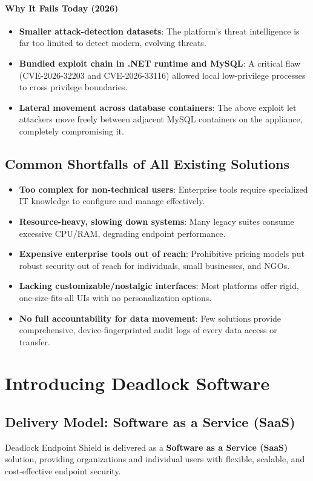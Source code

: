 \documentclass[12pt,letterpaper]{report}
\begin{document}
\subsubsection{Why It Fails Today (2026)}
\begin{itemize}
    \item \textbf{Smaller attack-detection datasets}: The platform's threat intelligence is far too limited to detect modern, evolving threats.
    \item \textbf{Bundled exploit chain in .NET runtime and MySQL}: A critical flaw (CVE-2026-32203 and CVE-2026-33116) allowed local low-privilege processes to cross privilege boundaries.
    \item \textbf{Lateral movement across database containers}: The above exploit let attackers move freely between adjacent MySQL containers on the appliance, completely compromising it.
\end{itemize}

\section{Common Shortfalls of All Existing Solutions}
\begin{itemize}
    \item \textbf{Too complex for non-technical users}: Enterprise tools require specialized IT knowledge to configure and manage effectively.
    \item \textbf{Resource-heavy, slowing down systems}: Many legacy suites consume excessive CPU/RAM, degrading endpoint performance.
    \item \textbf{Expensive enterprise tools out of reach}: Prohibitive pricing models put robust security out of reach for individuals, small businesses, and NGOs.
    \item \textbf{Lacking customizable/nostalgic interfaces}: Most platforms offer rigid, one-size-fits-all UIs with no personalization options.
    \item \textbf{No full accountability for data movement}: Few solutions provide comprehensive, device-fingerprinted audit logs of every data access or transfer.
\end{itemize}

\chapter{Introducing Deadlock Software}
\section{Delivery Model: Software as a Service (SaaS)}
Deadlock Endpoint Shield is delivered as a \textbf{Software as a Service (SaaS)} solution, providing organizations and individual users with flexible, scalable, and cost-effective endpoint security.
\end{document}
